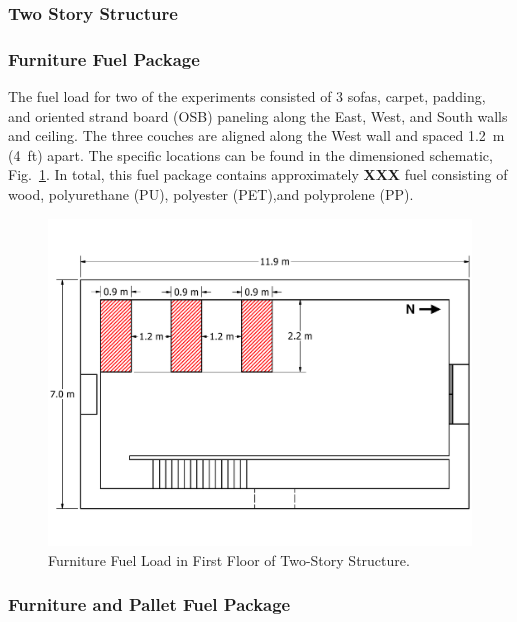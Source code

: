 \documentclass[12pt,oneside]{book}
\begin{document}
\subsubsection*{Two Story Structure}
\label{sec:suppresion_two}

\subsubsection{Furniture Fuel Package}
\label{sec:fire_suppression_furniture_fuel_2}

The fuel load for two of the experiments consisted of 3 sofas, carpet, padding, and oriented strand board (OSB) paneling along the East, West, and South walls and ceiling. The three couches are aligned along the West wall and spaced 1.2~m (4~ft) apart. The specific locations can be found in the dimensioned schematic, Fig.~\ref{fig:furniture_2story}. In total, this fuel package contains approximately {\bf XXX} fuel consisting of wood, polyurethane (PU), polyester (PET),and polyprolene (PP).

\begin{figure}[!ht]
	\includegraphics[width=\columnwidth]{../../DelCo_2014_2015/Drawings/PDFs/CAFS/West_Structure_1st_Floor_Furniture_Only}
	\caption{Furniture Fuel Load in First Floor of Two-Story Structure.}
	\label{fig:furniture_2story}
\end{figure}

\subsubsection{Furniture and Pallet Fuel Package}
\label{sec:fire_suppression_combo_fuel_2}
\end{document}
